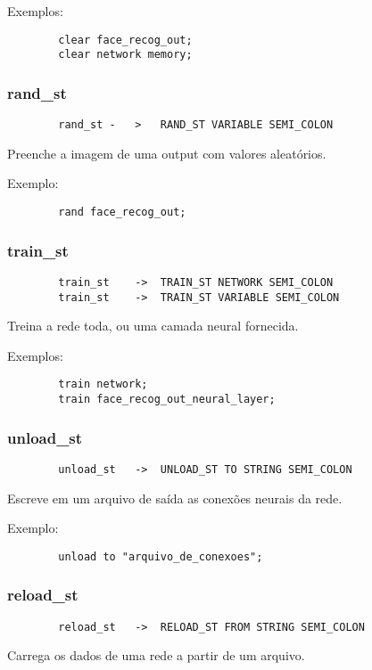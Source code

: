 \documentclass[a4paper,10pt]{article}
\begin{document}
		Exemplos:
		\begin{lstlisting}
		clear face_recog_out;
		clear network memory;
		\end{lstlisting}
		\vspace{10mm}
	\subsubsection{rand\_st}
		\begin{lstlisting}
		rand_st	-	>	RAND_ST VARIABLE SEMI_COLON
		\end{lstlisting}
		Preenche a imagem de uma output com valores aleat\'orios.
		
		Exemplo:
		\begin{lstlisting}
		rand face_recog_out;
		\end{lstlisting}
		\vspace{10mm}
	\subsubsection{train\_st}
		\begin{lstlisting}
		train_st	->	TRAIN_ST NETWORK SEMI_COLON
		train_st	->	TRAIN_ST VARIABLE SEMI_COLON
		\end{lstlisting}
		Treina a rede toda, ou uma camada neural fornecida.
		
		Exemplos:
		\begin{lstlisting}
		train network;
		train face_recog_out_neural_layer;
		\end{lstlisting}
		\vspace{10mm}
	\subsubsection{unload\_st}
		\begin{lstlisting}
		unload_st	->	UNLOAD_ST TO STRING SEMI_COLON
		\end{lstlisting}
		Escreve em um arquivo de sa\'ida as conex\~oes neurais da rede.
		
		Exemplo:
		\begin{lstlisting}
		unload to "arquivo_de_conexoes";
		\end{lstlisting}
		\vspace{10mm}
	\subsubsection{reload\_st}
		\begin{lstlisting}
		reload_st	->	RELOAD_ST FROM STRING SEMI_COLON
		\end{lstlisting}
		Carrega os dados de uma rede a partir de um arquivo.
		
\end{document}
